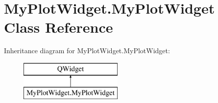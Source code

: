 \hypertarget{classMyPlotWidget_1_1MyPlotWidget}{\section{My\-Plot\-Widget.\-My\-Plot\-Widget Class Reference}
\label{classMyPlotWidget_1_1MyPlotWidget}
}
Inheritance diagram for My\-Plot\-Widget.\-My\-Plot\-Widget\-:\begin{figure}[H]
\begin{center}
\leavevmode
\includegraphics[height=2.000000cm]{classMyPlotWidget_1_1MyPlotWidget}
\end{center}
\end{figure}
